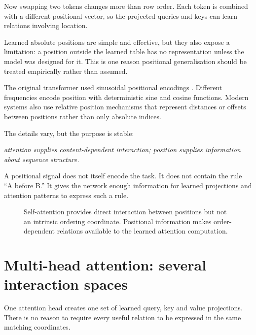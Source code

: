 Now swapping two tokens changes more than row order. Each token is combined with a different positional vector, so the projected queries and keys can learn relations involving location.

Learned absolute positions are simple and effective, but they also expose a limitation: a position outside the learned table has no representation unless the model was designed for it. This is one reason positional generalisation should be treated empirically rather than assumed.

The original transformer used sinusoidal positional encodings \parencite{vaswani2017}. Different frequencies encode position with deterministic sine and cosine functions. Modern systems also use relative position mechanisms that represent distances or offsets between positions rather than only absolute indices.

The details vary, but the purpose is stable:
\begin{center}
  \emph{attention supplies content-dependent interaction; position supplies information about sequence structure.}
\end{center}

A positional signal does not itself encode the task. It does not contain the rule ``A before B.'' It gives the network enough information for learned projections and attention patterns to express such a rule.

\begin{figure}[ht]
  \caption{Self-attention provides direct interaction between positions but not an intrinsic ordering coordinate. Positional information makes order-dependent relations available to the learned attention computation.}
  \label{fig:week9-position}
\end{figure}

\section{Multi-head attention: several interaction spaces}

One attention head creates one set of learned query, key and value projections. There is no reason to require every useful relation to be expressed in the same matching coordinates.


